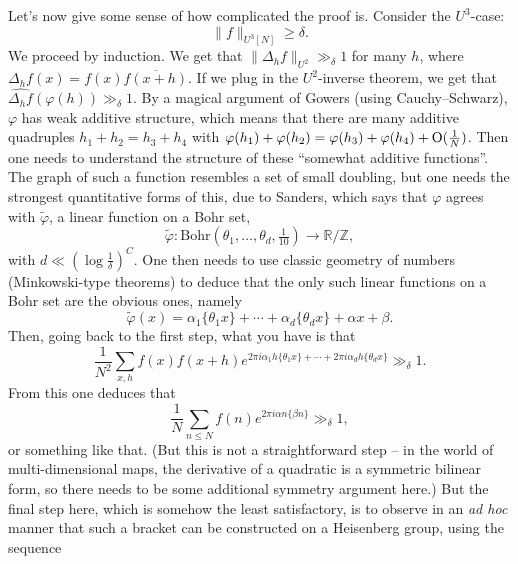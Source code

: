 \documentclass[reqno]{amsart} 
\numberwithin{theorem}{section}
\numberwithin{equation}{section}
\begin{document}
Let's now give some sense of how complicated the proof is.  Consider the $U^3$-case:
\begin{equation*}
  \lVert f \rVert_{U^3[N]} \geq \delta.
\end{equation*}
We proceed by induction.  We get that $\lVert \Delta_h f \rVert_{U^2} \gg_\delta 1$ for many $h$, where $\Delta_h f(x) = f(x) \overline{f(x + h)}$.  If we plug in the $U^2$-inverse theorem, we get that $\widehat{\Delta_h f}(\varphi(h)) \gg_\delta 1$.  By a magical argument of Gowers (using Cauchy--Schwarz), $\varphi$ has weak additive structure, which means that there are many additive quadruples $h_1 + h_2 = h_3 + h_4$ with $\varphi(h_1) + \varphi(h_2) = \varphi(h_3) + \varphi(h_4) + \operatorname{O}(\tfrac{1}{N})$.  Then one needs to understand the structure of these ``somewhat additive functions''.  The graph of such a function resembles a set of small doubling, but one needs the strongest quantitative forms of this, due to Sanders, which says that $\varphi$ agrees with $\tilde{\varphi}$, a linear function on a Bohr set,
\begin{equation*}
  \tilde{\varphi} : \mathrm{Bohr}(\theta_1, \dotsc, \theta_d, \tfrac{1}{10}) \rightarrow \mathbb{R} / \mathbb{Z},
\end{equation*}
with $d \ll(\log \tfrac{1}{\delta})^{C}$.  One then needs to use classic geometry of numbers (Minkowski-type theorems) to deduce that the only such linear functions on a Bohr set are the obvious ones, namely
\begin{equation*}
  \tilde{\varphi}(x) = \alpha_1 \{\theta_1 x\} + \dotsb + \alpha_d \{\theta_d x\} + \alpha x + \beta .
\end{equation*}
Then, going back to the first step, what you have is that
\begin{equation*}
  \frac{1}{N^2} \sum_{x, h} f(x) f(x + h) e^{2 \pi i \alpha_1 h \{\theta_1 x\} + \dotsb + 2 \pi i \alpha_d h \{\theta_d x\}} \gg_\delta 1.
\end{equation*}
From this one deduces that
\begin{equation*}
  \frac{1}{N} \sum_{n \leq N} f(n) e^{2 \pi i \alpha n \{\beta n\}} \gg_\delta 1,
\end{equation*}
or something like that.  (But this is not a straightforward step -- in the world of multi-dimensional maps, the derivative of a quadratic is a symmetric bilinear form, so there needs to be some additional symmetry argument here.)  But the final step here, which is somehow the least satisfactory, is to observe in an \emph{ad hoc} manner that such a bracket can be constructed on a Heisenberg group, using the sequence
\end{document}
